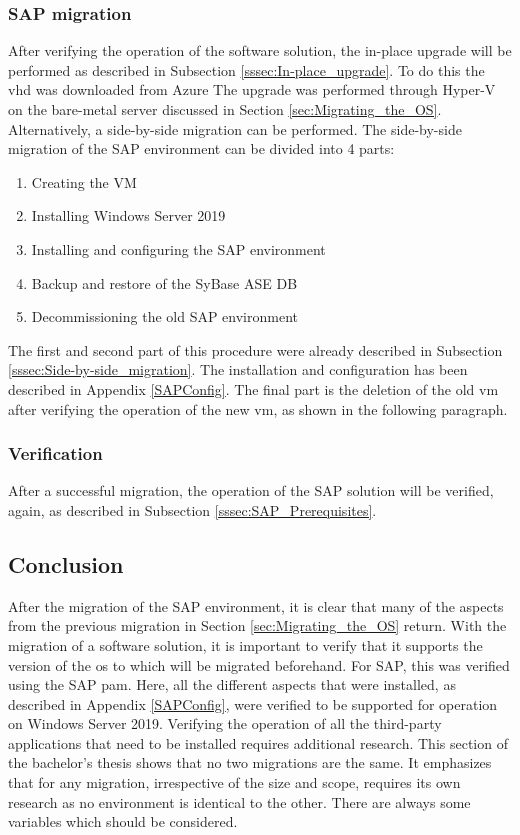 \subsubsection{SAP migration}
After verifying the operation of the software solution, the in-place upgrade will be performed as described in Subsection \ref{sssec:In-place_upgrade}. To do this the \acrfull{vhd} was downloaded from Azure
The upgrade was performed through Hyper-V on the bare-metal server discussed in Section \ref{sec:Migrating_the_OS}.
Alternatively, a side-by-side migration can be performed. 
The side-by-side migration of the SAP environment can be divided into 4 parts:
\begin{enumerate}
    \item Creating the VM
    \item Installing Windows Server 2019
    \item Installing and configuring the SAP environment
    \item Backup and restore of the SyBase ASE DB
    \item Decommissioning the old SAP environment
\end{enumerate}
The first and second part of this procedure were already described in Subsection \ref{sssec:Side-by-side_migration}.
The installation and configuration has been described in Appendix \ref{SAPConfig}. 
The final part is the deletion of the old \acrshort{vm} after verifying the operation of the new \acrshort{vm}, as shown in the following paragraph.

\subsubsection{Verification}
After a successful migration, the operation of the SAP solution will be verified, again, as described in Subsection \ref{sssec:SAP_Prerequisites}.

\subsection{Conclusion}
After the migration of the SAP environment, it is clear that many of the aspects from the previous migration in Section \ref{sec:Migrating_the_OS} return. 
With the migration of a software solution, it is important to verify that it supports the version of the \acrshort{os} to which will be migrated beforehand. 
For SAP, this was verified using the SAP \acrshort{pam}.
Here, all the different aspects that were installed, as described in Appendix \ref{SAPConfig}, were verified to be supported for operation on Windows Server 2019. 
Verifying the operation of all the third-party applications that need to be installed requires additional research. 
This section of the bachelor's thesis shows that no two migrations are the same. 
It emphasizes that for any migration, irrespective of the size and scope, requires its own research as no environment is identical to the other. 
There are always some variables which should be considered.  
\clearpage


